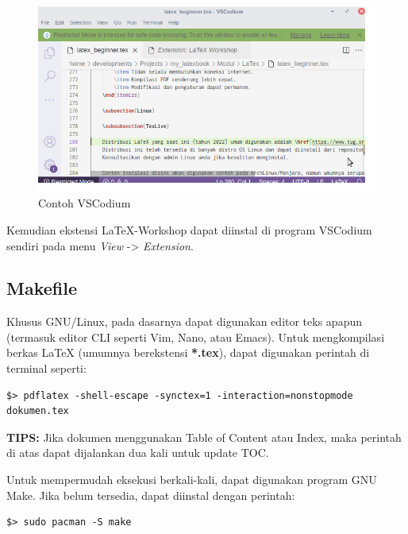 \documentclass{book} %
\begin{document}
	\begin{figure}[!ht]
		\centering
		\includegraphics[width=400pt]{images/vscodium}
		\caption{Contoh VSCodium}
	\end{figure}

	Kemudian ekstensi LaTeX-Workshop dapat diinstal di program VSCodium sendiri pada menu \textit{View} -> \textit{Extension}.

	\newpage
	\subsection{Makefile}

	Khusus GNU/Linux, pada dasarnya dapat digunakan editor teks apapun (termasuk editor CLI seperti Vim, Nano, atau Emacs).
	Untuk mengkompilasi berkas \LaTeX{} (umumnya berekstensi \textbf{*.tex}), dapat digunakan perintah di terminal seperti:

	\begin{verbatim}
$> pdflatex -shell-escape -synctex=1 -interaction=nonstopmode dokumen.tex
	\end{verbatim}

	\textbf{TIPS:} Jika dokumen menggunakan Table of Content atau Index, maka perintah di atas dapat dijalankan dua kali untuk update TOC.

	Untuk mempermudah eksekusi berkali-kali, dapat digunakan program GNU Make.
	Jika belum tersedia, dapat diinstal dengan perintah:

	\begin{verbatim}
$> sudo pacman -S make
	\end{verbatim}
\end{document}
